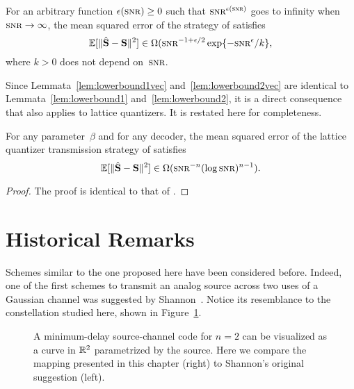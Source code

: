 \begin{lemma}
  \label{lem:lowerbound2vec}
  For an arbitrary function $\e(\snr) \ge 0$ such that 
  $\snr^{\e(\snr)}$ goes to infinity when $\snr \goesto \infty$, the mean
  squared error of the strategy of  satisfies
  \begin{equation*}
    \msev \in \Omega(\snr^{-1 + \e/2} \exp\{- \snr^\e/k \},
  \end{equation*}
  where $k > 0$ does not depend on~$\snr$.
\end{lemma}

Since Lemmata~\ref{lem:lowerbound1vec} and~\ref{lem:lowerbound2vec} are
identical to Lemmata~\ref{lem:lowerbound1} and~\ref{lem:lowerbound2}, it is a
direct consequence that  also applies to lattice quantizers.
It is restated here for completeness.

\begin{theorem}
  \label{thm:scalinglbvec}
  For any parameter~$\beta$ and for any decoder, the mean squared error of the
  lattice quantizer transmission strategy of  satisfies
  \begin{equation*}
    \msev \in \Omega(\snr^{-n} (\log\snr)^{n-1}).
  \end{equation*}
\end{theorem}

\begin{proof}
  The proof is identical to that of .
\end{proof}








\section{Historical Remarks}

Schemes similar to the one proposed here have been considered before. Indeed,
one of the first schemes to transmit an analog source across two uses of a
Gaussian channel was suggested by Shannon~\cite{Shannon1949}. Notice its
resemblance to the constellation studied here, shown in
Figure~\ref{fig:shannoncomparison}.
\begin{figure}
  \centerline{
  \hfil
  \subfloat[Mapping proposed in this paper
  (for~$n=2$).]{} }%
  \caption{A minimum-delay source-channel code for $n=2$ can be visualized as a
  curve in $\mathbb{R}^2$ parametrized by the source. Here we compare the mapping
  presented in this chapter (right) to Shannon's original suggestion (left).}
  \label{fig:shannoncomparison}
\end{figure}

